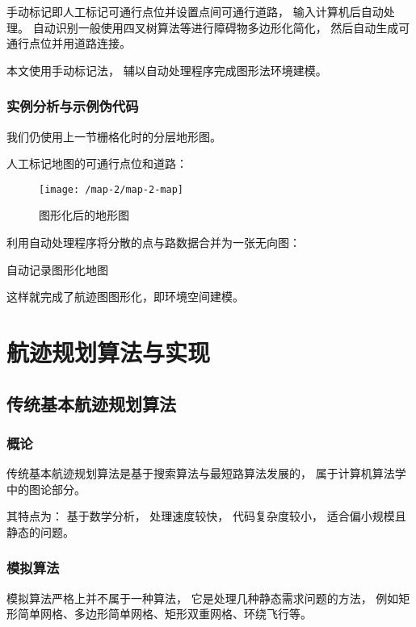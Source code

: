 \documentclass[12pt,a4paper,oneside,UTF8]{ctexart}
\begin{document}
手动标记即人工标记可通行点位并设置点间可通行道路，
输入计算机后自动处理。
自动识别一般使用四叉树算法等进行障碍物多边形化简化，
然后自动生成可通行点位并用道路连接。

本文使用手动标记法，
辅以自动处理程序完成图形法环境建模。
\subsubsection{实例分析与示例伪代码}
我们仍使用上一节栅格化时的分层地形图。

人工标记地图的可通行点位和道路：
\begin{figure}[H]
  \centering
  \texttt{[image: /map-2/map-2-map]}
  \caption{图形化后的地形图}
  \label{fig:map-2-map}
\end{figure}

利用自动处理程序将分散的点与路数据合并为一张无向图：

\begin{algorithm}[H]
  \caption{自动记录图形化地图}\label{algorithm-map-noted}

\end{algorithm}

这样就完成了航迹图图形化，即环境空间建模。
\newpage\section{航迹规划算法与实现}
\subsection{传统基本航迹规划算法}
\subsubsection{概论}
传统基本航迹规划算法是基于搜索算法与最短路算法发展的，
属于计算机算法学中的图论部分。

其特点为：
基于数学分析，
处理速度较快，
代码复杂度较小，
适合偏小规模且静态的问题。

\subsubsection{模拟算法}
模拟算法严格上并不属于一种算法，
它是处理几种静态需求问题的方法，
例如矩形简单网格、多边形简单网格、矩形双重网格、环绕飞行等。
\end{document}
